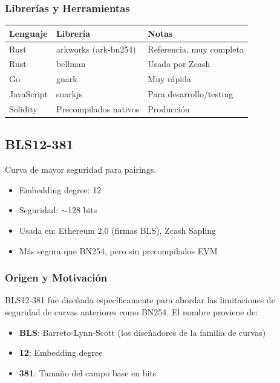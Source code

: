 \documentclass[11pt,a4paper,twoside,openright]{book}
\theoremstyle{definition}
\theoremstyle{plain}
\theoremstyle{remark}
\begin{document}
\subsubsection{Librerías y Herramientas}

\begin{center}
\begin{tabular}{lll}
\toprule
\textbf{Lenguaje} & \textbf{Librería} & \textbf{Notas} \\
\midrule
Rust & arkworks (ark-bn254) & Referencia, muy completa \\
Rust & bellman & Usada por Zcash \\
Go & gnark & Muy rápida \\
JavaScript & snarkjs & Para desarrollo/testing \\
Solidity & Precompilados nativos & Producción \\
\bottomrule
\end{tabular}
\end{center}


\subsection{BLS12-381}

Curva de mayor seguridad para pairings.
\begin{itemize}
    \item Embedding degree: 12
    \item Seguridad: $\sim$128 bits
    \item Usada en: Ethereum 2.0 (firmas BLS), Zcash Sapling
    \item Más segura que BN254, pero sin precompilados EVM
\end{itemize}

\subsubsection{Origen y Motivación}

\begin{intuicion}
BLS12-381 fue diseñada específicamente para abordar las limitaciones de seguridad de curvas anteriores como BN254. El nombre proviene de:
\begin{itemize}
    \item \textbf{BLS}: Barreto-Lynn-Scott (los diseñadores de la familia de curvas)
    \item \textbf{12}: Embedding degree
    \item \textbf{381}: Tamaño del campo base en bits
\end{itemize}
\end{intuicion}
\end{document}
